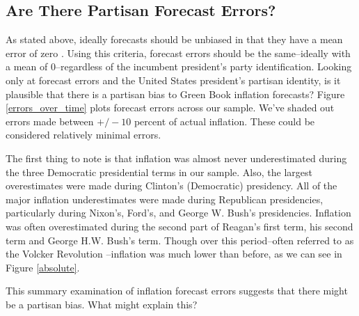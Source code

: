 \documentclass[a4paper]{article}\usepackage{graphicx, color}
\begin{document}
\subsection{Are There Partisan Forecast Errors?}

As stated above, ideally forecasts should be unbiased in that they have a mean error of zero \citep[5]{Bruck2006}. Using this criteria, forecast errors should be the same--ideally with a mean of 0--regardless of the incumbent president's party identification. Looking only at forecast errors and the United States president's partisan identity, is it plausible that there is a partisan bias to Green Book inflation forecasts? Figure \ref{errors_over_time} plots forecast errors across our sample. We've shaded out errors made between $+/- 10$ percent of actual inflation. These could be considered relatively minimal errors. 

The first thing to note is that inflation was almost never underestimated during the three Democratic presidential terms in our sample. Also, the largest overestimates were made during Clinton's (Democratic) presidency. All of the major inflation underestimates were made during Republican presidencies, particularly during Nixon's, Ford's, and George W. Bush's presidencies. Inflation was often overestimated during the second part of Reagan's first term, his second term and George H.W. Bush's term. Though over this period--often referred to as the Volcker Revolution \citep[see][]{Bartels1985}--inflation was much lower than before, as we can see in Figure \ref{absolute}.

This summary examination of inflation forecast errors suggests that there might be a partisan bias. What might explain this?
\end{document}
